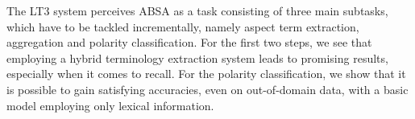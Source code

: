 The LT3 system perceives ABSA as a task consisting of three main subtasks, which have to be tackled incrementally, namely aspect term extraction, aggregation and polarity classification. For the first two steps, we see that employing a hybrid terminology extraction system leads to promising results, especially when it comes to recall. For the polarity classification, we show that it is possible to gain satisfying accuracies, even on out-of-domain data, with a basic model employing only lexical information.
